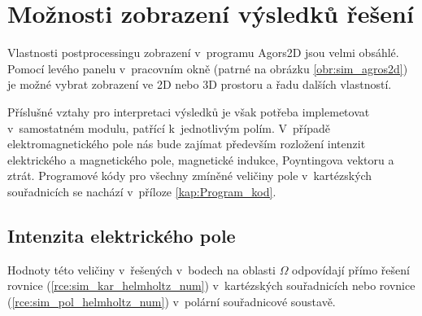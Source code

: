 \section{Možnosti zobrazení výsledků řešení}
Vlastnosti postprocessingu zobrazení v~programu Agors2D jsou velmi obsáhlé. Pomocí levého panelu v~pracovním okně (patrné na obrázku \ref{obr:sim_agros2d}) je možné vybrat zobrazení ve 2D nebo 3D prostoru a řadu dalších vlastností. 

Příslušné vztahy pro interpretaci výsledků je však potřeba implemetovat v~samostatném modulu, patřící k~jednotlivým polím. V~případě elektromagnetického pole nás bude zajímat především rozložení intenzit elektrického a magnetického pole, magnetické indukce, Poyntingova vektoru a ztrát. Programové kódy pro všechny zmíněné veličiny pole v~kartézských souřadnicích se nachází v~příloze \ref{kap:Program_kod}. 
 
\subsection*{Intenzita elektrického pole}
Hodnoty této veličiny v~řešených v~bodech na oblasti $\Omega$ odpovídají přímo řešení rovnice (\ref{rce:sim_kar_helmholtz_num}) v~kartézských souřadnicích nebo rovnice (\ref{rce:sim_pol_helmholtz_num}) v~polární souřadnicové soustavě.

